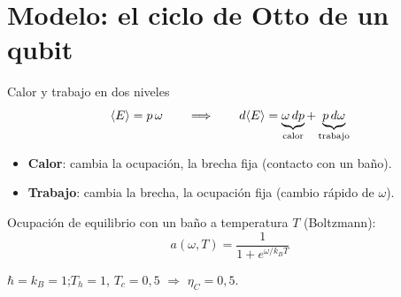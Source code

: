 \section{Modelo: el ciclo de Otto de un qubit}

\begin{frame}{Calor y trabajo en dos niveles}
    \[
        \langle E \rangle = p\,\omega
        \qquad\Longrightarrow\qquad
        d\langle E \rangle = \underbrace{\omega\,dp}_{\text{calor}} + \underbrace{p\,d\omega}_{\text{trabajo}}
    \]

    \vspace{4pt}
    \begin{itemize}
        \item \textbf{Calor}: cambia la ocupación, la brecha fija (contacto con un baño).
        \item \textbf{Trabajo}: cambia la brecha, la ocupación fija (cambio rápido de $\omega$).
    \end{itemize}

    \vspace{4pt}
    Ocupación de equilibrio con un baño a temperatura $T$ (Boltzmann):
    \[
        a(\omega, T) = \frac{1}{1+e^{\omega/k_BT}}
    \]

    {\small $\hbar = k_B = 1$;\quad $T_h = 1$,\; $T_c = 0{,}5$ \;$\Rightarrow$\; $\eta_C = 0{,}5$.}
\end{frame}

